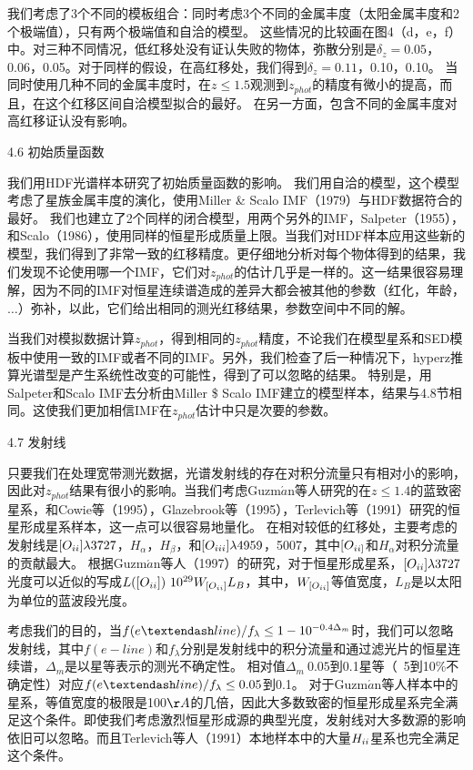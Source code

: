 我们考虑了3个不同的模板组合：同时考虑3个不同的金属丰度（太阳金属丰度和2个极端值），只有两个极端值和自洽的模型。
这些情况的比较画在图4（d，e，f）中。对三种不同情况，低红移处没有证认失败的物体，弥散分别是$\delta_z=0.05$，0.06，0.05。对于同样的假设，在高红移处，我们得到$\delta_z=0.11$，0.10，0.10。
当同时使用几种不同的金属丰度时，在$z\leq1.5$观测到$z_{phot}$的精度有微小的提高，而且，在这个红移区间自洽模型拟合的最好。
在另一方面，包含不同的金属丰度对高红移证认没有影响。
 
4.6 初始质量函数
 
我们用HDF光谱样本研究了初始质量函数的影响。
我们用自洽的模型，这个模型考虑了星族金属丰度的演化，使用Miller \& Scalo IMF（1979）与HDF数据符合的最好。
我们也建立了2个同样的闭合模型，用两个另外的IMF，Salpeter（1955），和Scalo（1986），使用同样的恒星形成质量上限。当我们对HDF样本应用这些新的模型，我们得到了非常一致的红移精度。更仔细地分析对每个物体得到的结果，我们发现不论使用哪一个IMF，它们对$z_{phot}$的估计几乎是一样的。这一结果很容易理解，因为不同的IMF对恒星连续谱造成的差异大都会被其他的参数（红化，年龄，$\dots$）弥补，以此，它们给出相同的测光红移结果，参数空间中不同的解。
 
当我们对模拟数据计算$z_{phot}$，得到相同的$z_{phot}$精度，不论我们在模型星系和SED模板中使用一致的IMF或者不同的IMF。另外，我们检查了后一种情况下，hyperz推算光谱型是产生系统性改变的可能性，得到了可以忽略的结果。
特别是，用Salpeter和Scalo IMF去分析由Miller \$ Scalo IMF建立的模型样本，结果与4.8节相同。这使我们更加相信IMF在$z_{phot}$估计中只是次要的参数。
 
4.7 发射线
 
只要我们在处理宽带测光数据，光谱发射线的存在对积分流量只有相对小的影响，因此对$z_{phot}$结果有很小的影响。当我们考虑Guzm$\acute{a}$n等人研究的在$z\leq1.4$的蓝致密星系，和Cowie等（1995），Glazebrook等（1995），Terlevich等（1991）研究的恒星形成星系样本，这一点可以很容易地量化。
在相对较低的红移处，主要考虑的发射线是$[O_{\uppercase\expandafter{\romannumeral2}}]\lambda3727$，$H_\alpha$，$H_\beta$，和$[O_{\uppercase\expandafter{\romannumeral3}}]\lambda4959$，5007，其中$[O_{\uppercase\expandafter{\romannumeral2}]}$和$H_\alpha$对积分流量的贡献最大。
根据Guzm$\acute{a}$n等人（1997）的研究，对于恒星形成星系，$[O_{\uppercase\expandafter{\romannumeral2}}]\lambda3727$光度可以近似的写成$L([O_{\uppercase\expandafter{\romannumeral2}}])~10^{29} W_{[O_{\uppercase\expandafter{\romannumeral2}}]}L_B$，其中，$W_{[O_{\uppercase\expandafter{\romannumeral2}}]}$等值宽度，$L_B$是以太阳为单位的蓝波段光度。
 
考虑我们的目的，当$f(e\textendash line)/f_\lambda\leq1-10^{-0.4\Delta_m}$时，我们可以忽略发射线，其中$f(e-line)$和$f_\lambda$分别是发射线中的积分流量和通过滤光片的恒星连续谱，$\Delta_m$是以星等表示的测光不确定性。
相对值$\Delta_m~0.05$到0.1星等（~5到10\%不确定性）对应$f(e\textendash line)/f_\lambda\leq0.05$到0.1。
对于Guzm$\acute{a}$n等人样本中的星系，等值宽度的极限是100$\AA$的几倍，因此大多数致密的恒星形成星系完全满足这个条件。即使我们考虑激烈恒星形成源的典型光度，发射线对大多数源的影响依旧可以忽略。而且Terlevich等人（1991）本地样本中的大量$H_{\uppercase\expandafter{\romannumeral2}}$星系也完全满足这个条件。
 
